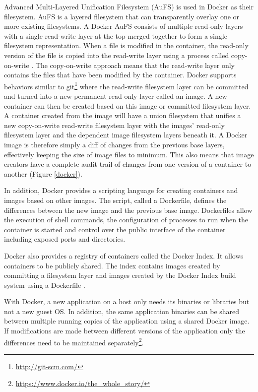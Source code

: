 \documentclass[a4paper,11pt,twoside]{report}
\begin{document}
Advanced Multi-Layered Unification Filesystem (AuFS) is used in Docker as their filesystem. AuFS is a layered filesystem that can transparently overlay one or more existing filesystems. A Docker AuFS consists of multiple read-only layers with a single read-write layer at the top merged together to form a single filesystem representation. When a file is modified in the container, the read-only version of the file is copied into the read-write layer using a process called copy-on-write \cite{docker2}. The copy-on-write approach means that the read-write layer only contains the files that have been modified by the container. Docker supports behaviors similar to git\footnote {\url{http://git-scm.com/}} where the read-write filesystem layer can be committed and turned into a new permanent read-only layer called an image. A new container can then be created based on this image or committed filesystem layer. A container created from the image will have a union filesystem that unifies a new copy-on-write read-write filesystem layer with the images' read-only filesystem layer and the dependent image filesystem layers beneath it. A Docker image is therefore simply a diff of changes from the previous base layers, effectively keeping the size of image files to minimum. This also means that image creators have a complete audit trail of changes from one version of a container to another (Figure \ref{docker}). 

In addition,  Docker provides a scripting language for creating containers and images based on other images. The script, called a Dockerfile, defines the differences between the new image and the previous base image. Dockerfiles allow the execution of shell commands, the configuration of processes to run when the container is started and control over the public interface of the container including exposed ports and directories. 

Docker also provides a registry of containers called the Docker Index. It allows containers to be publicly shared. The index contains images created by committing a filesystem layer and images created by the Docker Index build system using a Dockerfile \cite{docker2}.
   
With Docker, a new application on a host only needs its binaries or libraries but not a new guest OS. In addition, the same application binaries can be shared between multiple running copies of the application using a shared Docker image. If modifications are made between different versions of the application only the differences need to be maintained separately\footnote{\label{dockerC} \url{https://www.docker.io/the_whole_story/}}. \bigskip
\end{document}
